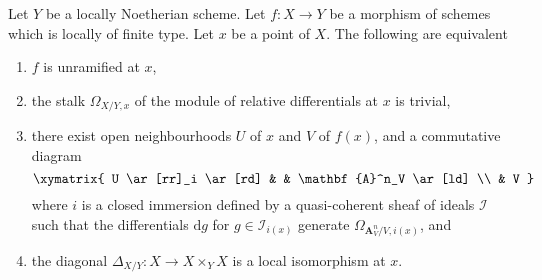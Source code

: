 \begin{theorem}
\label{theorem-unramified-equivalence}
Let $Y$ be a locally Noetherian scheme.
Let $f : X \to Y$ be a morphism of schemes which is locally of finite type.
Let $x$ be a point of $X$. The following are equivalent
\begin{enumerate}
\item $f$ is unramified at $x$,
\item the stalk $\Omega_{X/Y, x}$ of the module of relative differentials
at $x$ is trivial,
\item there exist open neighbourhoods $U$ of $x$ and $V$ of $f(x)$, and a
commutative diagram
$$
\xymatrix{
U \ar[rr]_i \ar[rd] & & \mathbf{A}^n_V \ar[ld] \\
& V
}
$$
where $i$ is a closed immersion defined by a
quasi-coherent sheaf of ideals $\mathcal{I}$ such that the differentials
$\text{d}g$ for $g \in \mathcal{I}_{i(x)}$ generate
$\Omega_{\mathbf{A}^n_V/V, i(x)}$, and
\item the diagonal $\Delta_{X/Y} : X \to X \times_Y X$
is a local isomorphism at $x$.
\end{enumerate}
\end{theorem}

